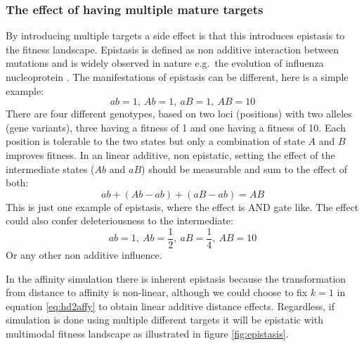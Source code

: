 \subsubsection{The effect of having multiple mature targets}
By introducing multiple targets a side effect is that this introduces epistasis to the fitness landscape.
Epistasis is defined as non additive interaction between mutations and is widely observed in nature e.g.\ the evolution of influenza nucleoprotein \cite{gong2013stability}.
The manifestations of epistasis can be different, here is a simple example:
$$
ab = 1,\ Ab = 1,\ aB = 1,\ AB = 10
$$
There are four different genotypes, based on two loci (positions) with two alleles (gene variants), three having a fitness of 1 and one having a fitness of 10.
Each position is tolerable to the two states but only a combination of state $A$ and $B$ improves fitness.
In an linear additive, non epistatic, setting the effect of the intermediate states ($Ab$ and $aB$) should be measurable and sum to the effect of both:
$$
ab + (Ab - ab) + (aB -ab) = AB
$$
This is just one example of epistasis, where the effect is AND gate like.
The effect could also confer deleteriousness to the intermediate:
$$
ab = 1,\ Ab = \frac{1}{2},\ aB = \frac{1}{4},\ AB = 10
$$
Or any other non additive influence.

In the affinity simulation there is inherent epistasis because the transformation from distance to affinity is non-linear, although we could choose to fix $k=1$ in equation \ref{eq:hd2affy} to obtain linear additive distance effects.
Regardless, if simulation is done using multiple different targets it will be epistatic with multimodal fitness landscape as illustrated in figure \ref{fig:epistasis}.

